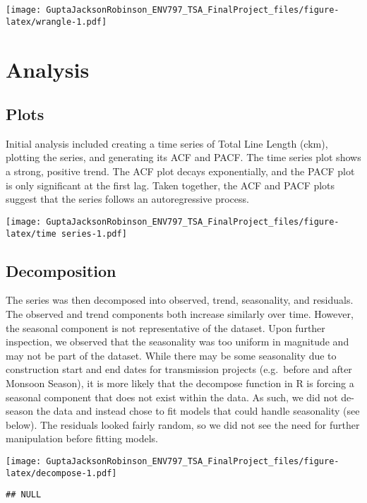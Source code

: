\documentclass[
]{article}
\begin{document}
\texttt{[image: GuptaJacksonRobinson\_ENV797\_TSA\_FinalProject\_files/figure-latex/wrangle-1.pdf]}

\hypertarget{analysis}{%
\section{Analysis}\label{analysis}}

\hypertarget{plots}{%
\subsection{Plots}\label{plots}}

Initial analysis included creating a time series of Total Line Length
(ckm), plotting the series, and generating its ACF and PACF. The time
series plot shows a strong, positive trend. The ACF plot decays
exponentially, and the PACF plot is only significant at the first lag.
Taken together, the ACF and PACF plots suggest that the series follows
an autoregressive process.

\texttt{[image: GuptaJacksonRobinson\_ENV797\_TSA\_FinalProject\_files/figure-latex/time series-1.pdf]}

\hypertarget{decomposition}{%
\subsection{Decomposition}\label{decomposition}}

The series was then decomposed into observed, trend, seasonality, and
residuals. The observed and trend components both increase similarly
over time. However, the seasonal component is not representative of the
dataset. Upon further inspection, we observed that the seasonality was
too uniform in magnitude and may not be part of the dataset. While there
may be some seasonality due to construction start and end dates for
transmission projects (e.g.~before and after Monsoon Season), it is more
likely that the decompose function in R is forcing a seasonal component
that does not exist within the data. As such, we did not de-season the
data and instead chose to fit models that could handle seasonality (see
below). The residuals looked fairly random, so we did not see the need
for further manipulation before fitting models.

\texttt{[image: GuptaJacksonRobinson\_ENV797\_TSA\_FinalProject\_files/figure-latex/decompose-1.pdf]}

\begin{verbatim}
## NULL
\end{verbatim}
\end{document}
